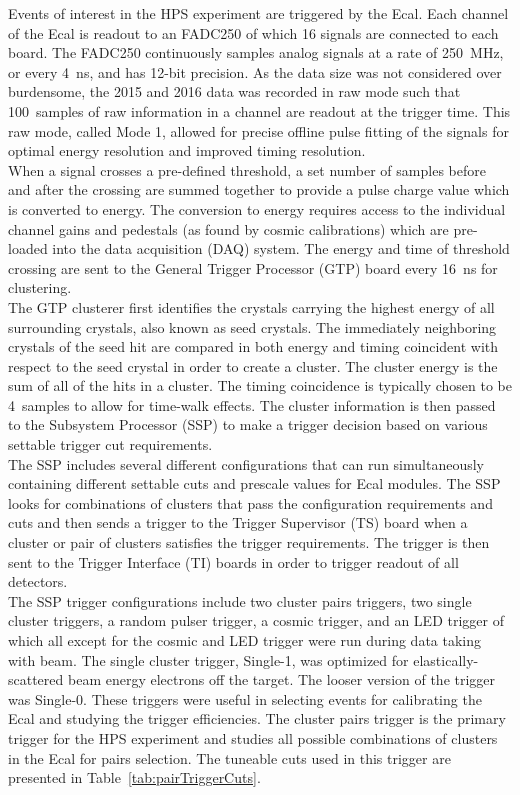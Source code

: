 Events of interest in the HPS experiment are triggered by the Ecal. Each channel of the Ecal is readout to an FADC250 of which 16 signals are connected to each board. The FADC250 continuously samples analog signals at a rate of 250~MHz, or every 4~ns, and has 12-bit precision. As the data size was not considered over burdensome, the 2015 and 2016 data was recorded in raw mode such that 100~samples of raw information in a channel are readout at the trigger time. This raw mode, called Mode 1, allowed for precise offline pulse fitting of the signals for optimal energy resolution and improved timing resolution.\\
\indent When a signal crosses a pre-defined threshold, a set number of samples before and after the crossing are summed together to provide a pulse charge value which is converted to energy. The conversion to energy requires access to the individual channel gains and pedestals (as found by cosmic calibrations) which are pre-loaded into the data acquisition (DAQ) system. The energy and time of threshold crossing are sent to the General Trigger Processor (GTP) board every 16~ns  for clustering.\\
\indent The GTP clusterer first identifies the crystals carrying the highest energy of all surrounding crystals, also known as seed crystals. The immediately neighboring crystals of the seed hit are compared in both energy and timing coincident with respect to the seed crystal in order to create a cluster. The cluster energy is the sum of all of the hits in a cluster. The timing coincidence is typically chosen to be 4~samples to allow for time-walk effects. The cluster information is then passed to the Subsystem Processor (SSP) to make a trigger decision based on various settable trigger cut requirements. \\
\indent The SSP includes several different configurations that can run simultaneously containing different settable cuts and prescale values for Ecal modules. The SSP looks for combinations of clusters that pass the configuration requirements and cuts and then sends a trigger to the Trigger Supervisor (TS) board when a cluster or pair of clusters satisfies the trigger requirements. The trigger is then sent to the Trigger Interface (TI) boards in order to trigger readout of all detectors.\\ 
\indent The SSP trigger configurations include two cluster pairs triggers, two single cluster triggers, a random pulser trigger, a cosmic trigger, and an LED trigger of which all except for the cosmic and LED trigger were run during data taking with beam. The single cluster trigger, Single-1, was optimized for elastically-scattered beam energy electrons off the target. The looser version of the trigger was Single-0. These triggers were useful in selecting events for calibrating the Ecal and studying the trigger efficiencies. The cluster pairs trigger is the primary trigger for the HPS experiment and studies all possible combinations of clusters in the Ecal for pairs selection. The tuneable cuts used in this trigger are presented in Table~\ref{tab:pairTriggerCuts}. 


